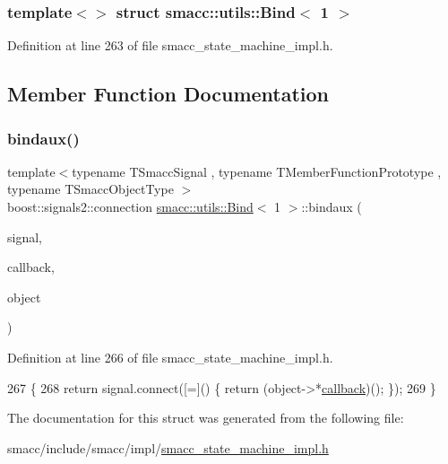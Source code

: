 \subsubsection*{template$<$$>$\newline
struct smacc\+::utils\+::\+Bind$<$ 1 $>$}



Definition at line 263 of file smacc\+\_\+state\+\_\+machine\+\_\+impl.\+h.



\subsection{Member Function Documentation}
\mbox{\label{structsmacc_1_1utils_1_1Bind_3_011_01_4_a5704d3cff0b914fc899ff385ff8f8bc2}} 
\subsubsection{\texorpdfstring{bindaux()}{bindaux()}}
{\footnotesize\ttfamily template$<$typename T\+Smacc\+Signal , typename T\+Member\+Function\+Prototype , typename T\+Smacc\+Object\+Type $>$ \\
boost\+::signals2\+::connection \hyperlink{structsmacc_1_1utils_1_1Bind}{smacc\+::utils\+::\+Bind}$<$ 1 $>$\+::bindaux (\begin{DoxyParamCaption}\item[{T\+Smacc\+Signal \&}]{signal,  }\item[{T\+Member\+Function\+Prototype}]{callback,  }\item[{T\+Smacc\+Object\+Type $\ast$}]{object }\end{DoxyParamCaption})\hspace{0.3cm}{\ttfamily [inline]}}



Definition at line 266 of file smacc\+\_\+state\+\_\+machine\+\_\+impl.\+h.


\begin{DoxyCode}
267       \{
268         \textcolor{keywordflow}{return} signal.connect([=]() \{ \textcolor{keywordflow}{return} (object->*\hyperlink{sm__ridgeback__barrel__search__1_2servers_2opencv__perception__node_2opencv__perception__node_8cpp_a050e697bd654facce10ea3f6549669b3}{callback})(); \});
269       \}
\end{DoxyCode}


The documentation for this struct was generated from the following file\+:\begin{DoxyCompactItemize}
\item 
smacc/include/smacc/impl/\hyperlink{smacc__state__machine__impl_8h}{smacc\+\_\+state\+\_\+machine\+\_\+impl.\+h}\end{DoxyCompactItemize}
